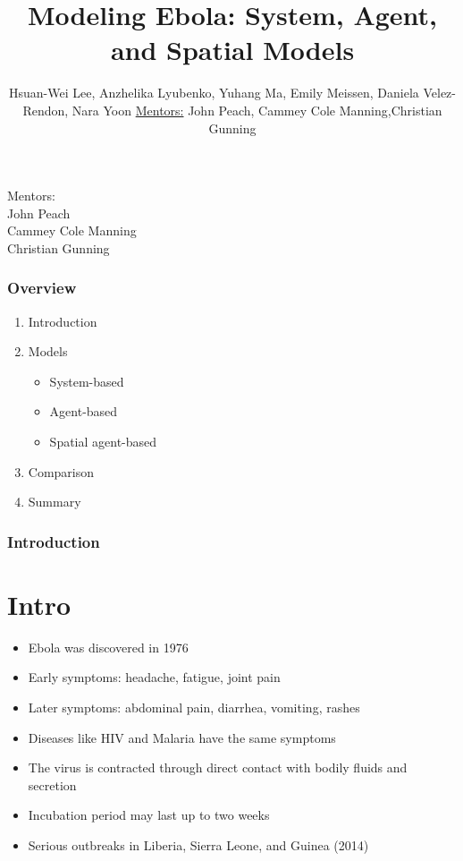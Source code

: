 \documentclass[30pt]{beamer}
\author{ Hsuan-Wei Lee,
  Anzhelika Lyubenko,
  Yuhang Ma,
  Emily Meissen,
  Daniela Velez-Rendon,
    Nara Yoon \newline \newline \underline{Mentors:} \newline John Peach, \newline Cammey Cole Manning,\newline Christian Gunning}
\title[]{Modeling Ebola: System, Agent, and Spatial Models}
\begin{document}
\begin{frame}[t,plain]
    \titlepage
    \begin{center}
Mentors:\\John Peach\\ Cammey Cole Manning\\
Christian Gunning
\end{center}
\end{frame}

\begin{frame}[t,plain]
    \frametitle{Overview}
\begin{enumerate}
\vfill
\item Introduction\vspace{2mm}
\item Models
\begin{itemize}
\item System-based
\item Agent-based
\item Spatial agent-based
\end{itemize}
\item Comparison
\item Summary
\end{enumerate}
\end{frame}

\begin{frame}
\frametitle{Introduction}
\section{Intro}
\begin{itemize}
\item Ebola was discovered in 1976
\item Early symptoms:  headache, fatigue, joint pain
\item Later symptoms: abdominal pain, diarrhea, vomiting, rashes
\item Diseases like HIV and Malaria have the same symptoms
\item The virus is contracted through direct contact with bodily fluids and secretion
\item Incubation period may last up to two weeks
\item Serious outbreaks in Liberia, Sierra Leone, and Guinea (2014)
\end{itemize}
\end{frame}
\end{document}
